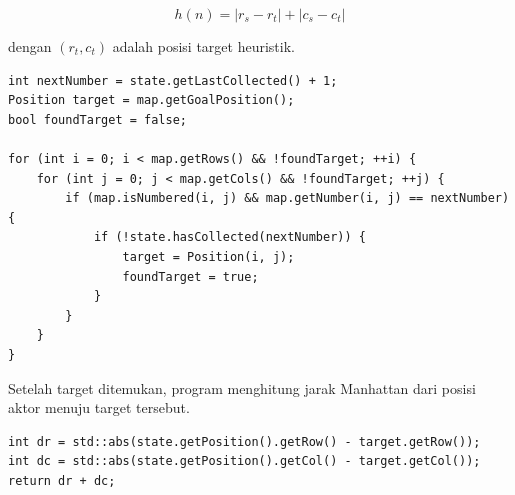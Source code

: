\[
	h(n)=|r_s-r_t|+|c_s-c_t|
\]

dengan $(r_t,c_t)$ adalah posisi target heuristik.

\begin{tcolorbox}[
	colback=orange!5,
	colframe=orange!70!black,
	title=\textbf{Potongan Implementasi Heuristik Custom},
	arc=2mm,
	boxrule=0.8pt
]
\small
\begin{verbatim}
int nextNumber = state.getLastCollected() + 1;
Position target = map.getGoalPosition();
bool foundTarget = false;

for (int i = 0; i < map.getRows() && !foundTarget; ++i) {
    for (int j = 0; j < map.getCols() && !foundTarget; ++j) {
        if (map.isNumbered(i, j) && map.getNumber(i, j) == nextNumber) {
            if (!state.hasCollected(nextNumber)) {
                target = Position(i, j);
                foundTarget = true;
            }
        }
    }
}
\end{verbatim}
\end{tcolorbox}

Setelah target ditemukan, program menghitung jarak Manhattan dari posisi aktor menuju target tersebut.

\begin{tcolorbox}[
	colback=orange!5,
	colframe=orange!70!black,
	title=\textbf{Perhitungan Nilai Custom},
	arc=2mm,
	boxrule=0.8pt
]
\small
\begin{verbatim}
int dr = std::abs(state.getPosition().getRow() - target.getRow());
int dc = std::abs(state.getPosition().getCol() - target.getCol());
return dr + dc;
\end{verbatim}
\end{tcolorbox}

